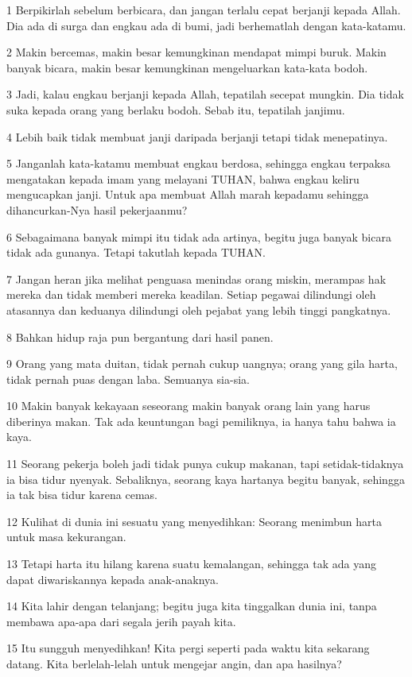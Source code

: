\par 1 Berpikirlah sebelum berbicara, dan jangan terlalu cepat berjanji kepada Allah. Dia ada di surga dan engkau ada di bumi, jadi berhematlah dengan kata-katamu.
\par 2 Makin bercemas, makin besar kemungkinan mendapat mimpi buruk. Makin banyak bicara, makin besar kemungkinan mengeluarkan kata-kata bodoh.
\par 3 Jadi, kalau engkau berjanji kepada Allah, tepatilah secepat mungkin. Dia tidak suka kepada orang yang berlaku bodoh. Sebab itu, tepatilah janjimu.
\par 4 Lebih baik tidak membuat janji daripada berjanji tetapi tidak menepatinya.
\par 5 Janganlah kata-katamu membuat engkau berdosa, sehingga engkau terpaksa mengatakan kepada imam yang melayani TUHAN, bahwa engkau keliru mengucapkan janji. Untuk apa membuat Allah marah kepadamu sehingga dihancurkan-Nya hasil pekerjaanmu?
\par 6 Sebagaimana banyak mimpi itu tidak ada artinya, begitu juga banyak bicara tidak ada gunanya. Tetapi takutlah kepada TUHAN.
\par 7 Jangan heran jika melihat penguasa menindas orang miskin, merampas hak mereka dan tidak memberi mereka keadilan. Setiap pegawai dilindungi oleh atasannya dan keduanya dilindungi oleh pejabat yang lebih tinggi pangkatnya.
\par 8 Bahkan hidup raja pun bergantung dari hasil panen.
\par 9 Orang yang mata duitan, tidak pernah cukup uangnya; orang yang gila harta, tidak pernah puas dengan laba. Semuanya sia-sia.
\par 10 Makin banyak kekayaan seseorang makin banyak orang lain yang harus diberinya makan. Tak ada keuntungan bagi pemiliknya, ia hanya tahu bahwa ia kaya.
\par 11 Seorang pekerja boleh jadi tidak punya cukup makanan, tapi setidak-tidaknya ia bisa tidur nyenyak. Sebaliknya, seorang kaya hartanya begitu banyak, sehingga ia tak bisa tidur karena cemas.
\par 12 Kulihat di dunia ini sesuatu yang menyedihkan: Seorang menimbun harta untuk masa kekurangan.
\par 13 Tetapi harta itu hilang karena suatu kemalangan, sehingga tak ada yang dapat diwariskannya kepada anak-anaknya.
\par 14 Kita lahir dengan telanjang; begitu juga kita tinggalkan dunia ini, tanpa membawa apa-apa dari segala jerih payah kita.
\par 15 Itu sungguh menyedihkan! Kita pergi seperti pada waktu kita sekarang datang. Kita berlelah-lelah untuk mengejar angin, dan apa hasilnya?
